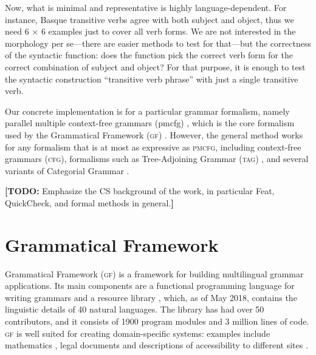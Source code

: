 \documentclass[11pt]{article}
\def\gf{\textsc{gf}}
\def\ccg{\textsc{ccg}}
\def\acg{\textsc{acg}}
\def\tag{\textsc{tag}}
\def\cfg{\textsc{cfg}}
\def\pmcfg{\textsc{pmcfg}}
\newcommand{\todo}[1]{{\color{cyan}\textbf{[TODO: }#1\textbf{]}}}
\begin{document}
Now, what is minimal and representative is highly language-dependent. 
For instance, Basque transitive verbs agree with both subject and
object, thus we need 6 $\times$ 6 examples just to cover all verb
forms. We are not interested in the morphology per se---there are
easier methods to test for that---but the correctness of the syntactic
function: does the function pick the correct verb form for the correct
combination of subject and object? For that purpose, it is enough to
test the syntactic construction ``transitive verb phrase'' with just a
single transitive verb.

Our concrete implementation is for a particular grammar formalism,
namely parallel multiple context-free grammars ({\sc pmcfg})
\cite{seki91pmcfg}, which is the core formalism used by the
Grammatical Framework (\gf) \cite{ranta2004gf}. However, the general
method works for any formalism that is at most as expressive as
\pmcfg{}, including context-free grammars (\cfg), formalisms such as Tree-Adjoining Grammar (\tag)
\cite{joshi1975tag}, and several variants of Categorial Grammar
\cite{deGroote2004,steedman1988ccg}.

\todo{Emphasize the CS background of the work, in particular Feat,
  QuickCheck, and formal methods in general.}

\section{Grammatical Framework}
\label{sec:GF}

Grammatical Framework (\gf) \cite{ranta2004gf} 
is a framework for building multilingual grammar applications. Its main
components are a functional programming language for writing grammars
and a resource library \cite{ranta2009rgl}, which, as of May 2018,
contains the linguistic details of 40 natural languages. The library
has had over 50 contributors, and it consists of 1900 program modules and 3
million lines of code. \gf{} is well suited for creating
domain-specific systems: examples include mathematics
\cite{caprotti2006webalt}, legal documents \cite{camilleri2017} and
descriptions of accessibility to different sites \cite{ranta2015grammar}.
\end{document}
